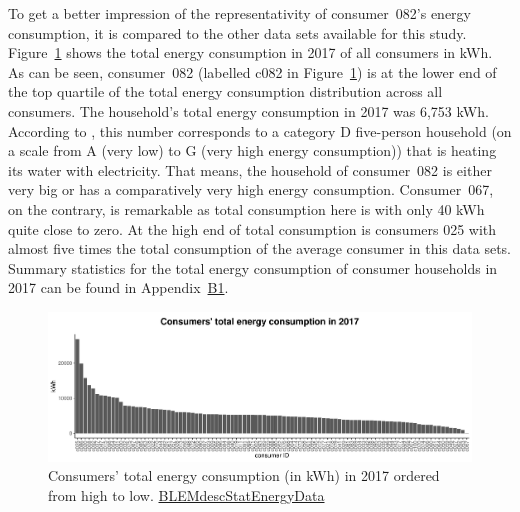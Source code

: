 To get a better impression of the representativity of consumer~082's energy consumption, it is compared to the other data sets available for this study. Figure~\ref{Fig:cons_total_consumption} shows the total energy consumption in  2017 of all consumers in kWh. As can be seen, consumer~082 (labelled c082 in Figure~\ref{Fig:cons_total_consumption}) is at the lower end of the top quartile of the total energy consumption distribution across all consumers. The household's total energy consumption in 2017 was 6,753 kWh. According to \citet{Stromspiegel:2017}, this number corresponds to a category D five-person household (on a scale from A (very low) to G (very high energy consumption)) that is heating its water with electricity. That means, the household of consumer~082 is either very big or has a comparatively very high energy consumption. Consumer~067, on the contrary, is remarkable as total consumption here is with only 40 kWh quite close to zero. At the high end of total consumption is consumers 025 with almost five times the total consumption of the average consumer in this data sets. Summary statistics for the total energy consumption of consumer households in 2017 can be found in Appendix~\hyperlink{AppB1:Tables:totalcons}{B1}.
%
\begin{figure}[htbp]
 \centering
\includegraphics[width=\textwidth]{thesis/graphs/consumer_totalconsumption.pdf}
\caption[Consumers' total energy consumption in 2017]{Consumers' total energy consumption (in kWh) in 2017 ordered from high to low. \quantnet\href{https://github.com/QuantLet/BLEM/tree/master/BLEMdescStatEnergyData}{BLEMdescStatEnergyData}}
\label{Fig:cons_total_consumption}
\end{figure}
%

